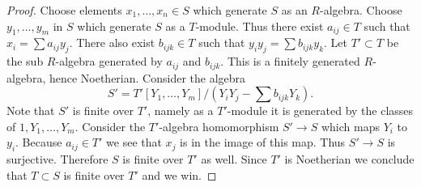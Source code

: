\documentclass[10pt,a4paper]{amsart}
\theoremstyle{plain}
\theoremstyle{definition}
\theoremstyle{remark}
\numberwithin{equation}{subsection}
\begin{document}
\begin{proof}
Choose elements $x_1, \ldots, x_n \in S$ which generate $S$ as an $R$-algebra.
Choose $y_1, \ldots, y_m$ in $S$ which generate $S$ as a $T$-module.
Thus there exist $a_{ij} \in T$ such that
$x_i = \sum a_{ij} y_j$. There also exist $b_{ijk} \in T$ such
that $y_i y_j = \sum b_{ijk} y_k$. Let $T' \subset T$ be the
sub $R$-algebra generated by $a_{ij}$ and $b_{ijk}$. This is a finitely
generated $R$-algebra, hence Noetherian. Consider the algebra
$$
S' = T'[Y_1, \ldots, Y_m]/(Y_i Y_j - \sum b_{ijk} Y_k).
$$
Note that $S'$ is finite over $T'$, namely as a $T'$-module it is
generated by the classes of $1, Y_1, \ldots, Y_m$.
Consider the $T'$-algebra homomorphism $S' \to S$ which maps
$Y_i$ to $y_i$. Because $a_{ij} \in T'$ we see that $x_j$ is
in the image of this map. Thus $S' \to S$ is surjective.
Therefore $S$ is finite over $T'$ as well. Since $T'$ is Noetherian
we conclude that $T \subset S$ is finite over $T'$ and
we win.
\end{proof}
\end{document}
